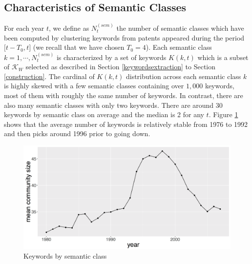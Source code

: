 \documentclass[article]{article}%
\begin{document}
\subsection{Characteristics of Semantic Classes}
\label{characteristics}
For each year $t$, we define as $N^{(sem)}_t$ the number of semantic classes which have been computed by clustering keywords from patents appeared during the period $\big[ t-T_0, t \big]$ (we recall that we have chosen $T_0=4$). Each semantic class $k =  1, \cdots, N^{(sem)}_t$ is characterized by a set of keywords $K(k,t)$ which is a subset of $\mathcal{K}_W$ selected as described in Section \ref{keywordsextraction} to Section \ref{construction}. The cardinal of $K(k, t)$ distribution across each semantic class $k$ is highly skewed with a few semantic classes containing over $1,000$ keywords, most of them with roughly the same number of keywords. In contrast, there are also many semantic classes with only two keywords. There are around 30 keywords by semantic class on average and the median is 2 for any $t$. Figure \ref{fig:mean_K} shows that the average number of keywords is relatively stable from 1976 to 1992 and then picks around 1996 prior to going down.



\begin{figure}
\centering
\includegraphics[width=\textwidth]{figures/Fig3}
\caption{Keywords by semantic class}
\label{fig:mean_K}
\end{figure}
\end{document}
